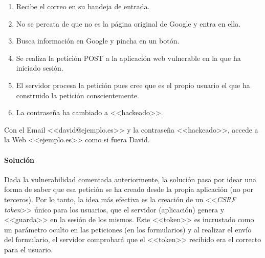 \begin{tcolorbox}[colback=green!5!white,colframe=green!75!black,title=David]
    \begin{enumerate}
        \item Recibe el correo en su bandeja de entrada.
        \item No se percata de que no es la página original de Google y entra en ella.
        \item Busca información en Google y pincha en un botón.
        \item Se realiza la petición POST a la aplicación web vulnerable en la que ha iniciado sesión.
        \item El servidor procesa la petición pues cree que es el propio usuario el que ha
        construido la petición conscientemente.
        \item La contraseña ha cambiado a <<hackeado>>.
    \end{enumerate}
\end{tcolorbox}

\begin{tcolorbox}[colback=red!5!white,colframe=red!75!black,title=Atacante]

Con el Email <<david@ejemplo.es>> y la contraseña <<hackeado>>, accede a la Web
<<ejemplo.es>> como si fuera David.

\end{tcolorbox}

\paragraph{Solución} Dada la vulnerabilidad comentada anteriormente, la solución
pasa por idear una forma de saber que esa petición se ha creado desde la propia
aplicación (no por terceros). Por lo tanto, la idea más efectiva es la creación
de un <<\emph{CSRF token}>> único para los usuarios, que el servidor
(aplicación) genera y <<guarda>> en la sesión de los mismos. Este <<token>> es
incrustado como un parámetro oculto en las peticiones (en los formularios) y al
realizar el envío del formulario, el servidor comprobará que el <<token>>
recibido era el correcto para el usuario.

